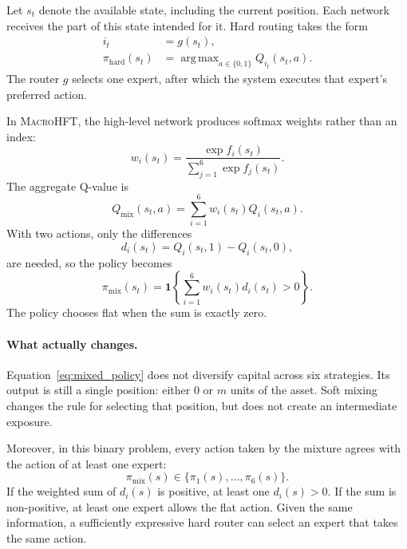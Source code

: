 \documentclass[9pt,a4paper,twocolumn]{extarticle}
\newcommand{\Macro}{\textsc{MacroHFT}}
\DeclareMathOperator*{\argmax}{arg\,max}
\begin{document}
Let $s_t$ denote the available state, including the current position. Each network receives the
part of this state intended for it. Hard routing takes the form
\begin{equation}
\begin{aligned}
  i_t &= g(s_t),\\
  \pi_{\mathrm{hard}}(s_t)
      &=\argmax_{a\in\{0,1\}}
        Q_{i_t}(s_t,a).
\end{aligned}
\label{eq:hard_routing}
\end{equation}
The router $g$ selects one expert, after which the system executes that expert's preferred action.

In \Macro{}, the high-level network produces softmax weights rather than an index:
\begin{equation}
  w_i(s_t)=
  \frac{\exp f_i(s_t)}
       {\sum_{j=1}^{6}\exp f_j(s_t)}.
  \label{eq:mixing_weights}
\end{equation}
The aggregate Q-value is
\begin{equation}
  Q_{\mathrm{mix}}(s_t,a)
  =
  \sum_{i=1}^{6}
  w_i(s_t)Q_i(s_t,a).
  \label{eq:mixed_q}
\end{equation}
With two actions, only the differences
\begin{equation}
  d_i(s_t)
  =
  Q_i(s_t,1)-Q_i(s_t,0),
  \label{eq:action_advantages}
\end{equation}
are needed, so the policy becomes
\begin{equation}
  \pi_{\mathrm{mix}}(s_t)
  =
  \mathbf 1\left\{
    \sum_{i=1}^{6}
    w_i(s_t)d_i(s_t)>0
  \right\}.
  \label{eq:mixed_policy}
\end{equation}
The policy chooses flat when the sum is exactly zero.

\paragraph{What actually changes.}

Equation~\eqref{eq:mixed_policy} does not diversify capital across six strategies. Its output is
still a single position: either $0$ or $m$ units of the asset. Soft mixing changes the rule for
selecting that position, but does not create an intermediate exposure.

Moreover, in this binary problem, every action taken by the mixture agrees with the action of at
least one expert:
\begin{equation}
  \pi_{\mathrm{mix}}(s)
  \in
  \{\pi_1(s),\ldots,\pi_6(s)\}.
  \label{eq:binary_action_support}
\end{equation}
If the weighted sum of $d_i(s)$ is positive, at least one $d_i(s)>0$. If the sum is non-positive,
at least one expert allows the flat action. Given the same information, a sufficiently expressive
hard router can select an expert that takes the same action.
\end{document}

